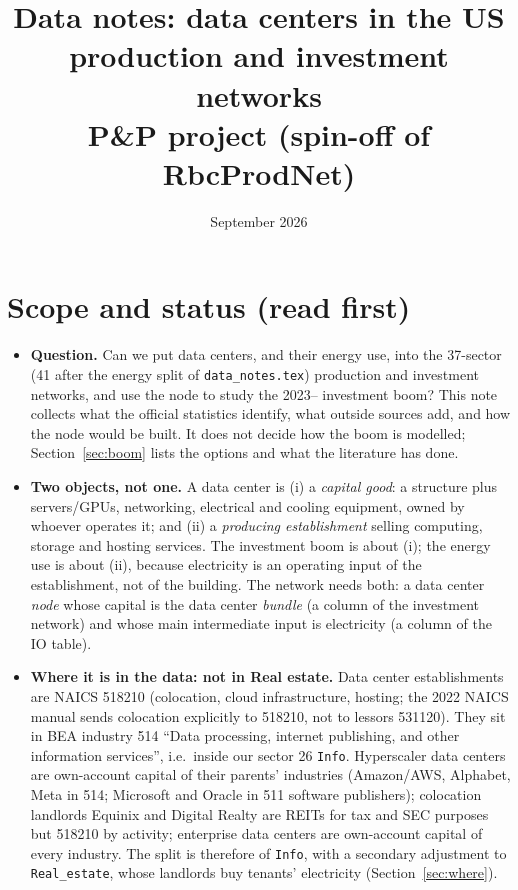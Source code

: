 \documentclass[11pt]{article}
\title{Data notes: data centers in the US production and investment networks\\
\large P\&P project (spin-off of RbcProdNet)}
\author{}
\date{September 2026}
\begin{document}
\maketitle

\section*{Scope and status (read first)}
\begin{itemize}
  \item \textbf{Question.} Can we put data centers, and their energy use, into the 37-sector (41 after the energy split of \texttt{data\_notes.tex}) production and investment networks, and use the node to study the 2023-- investment boom? This note collects what the official statistics identify, what outside sources add, and how the node would be built. It does not decide how the boom is modelled; Section~\ref{sec:boom} lists the options and what the literature has done.
  \item \textbf{Two objects, not one.} A data center is (i) a \emph{capital good}: a structure plus servers/GPUs, networking, electrical and cooling equipment, owned by whoever operates it; and (ii) a \emph{producing establishment} selling computing, storage and hosting services. The investment boom is about (i); the energy use is about (ii), because electricity is an operating input of the establishment, not of the building. The network needs both: a data center \emph{node} whose capital is the data center \emph{bundle} (a column of the investment network) and whose main intermediate input is electricity (a column of the IO table).
  \item \textbf{Where it is in the data: not in Real estate.} Data center establishments are NAICS 518210 (colocation, cloud infrastructure, hosting; the 2022 NAICS manual sends colocation explicitly to 518210, not to lessors 531120). They sit in BEA industry 514 ``Data processing, internet publishing, and other information services'', i.e.\ inside our sector 26 \texttt{Info}. Hyperscaler data centers are own-account capital of their parents' industries (Amazon/AWS, Alphabet, Meta in 514; Microsoft and Oracle in 511 software publishers); colocation landlords Equinix and Digital Realty are REITs for tax and SEC purposes but 518210 by activity; enterprise data centers are own-account capital of every industry. The split is therefore of \texttt{Info}, with a secondary adjustment to \texttt{Real\_estate}, whose landlords buy tenants' electricity (Section~\ref{sec:where}).

\end{itemize}
\end{document}
